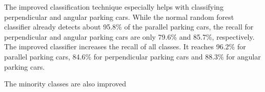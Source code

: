 The improved classification technique especially helps with classifying perpendicular and angular parking cars. While the normal random forest classifier already detects about 95.8\% of the parallel parking cars, the recall for perpendicular and angular parking cars are only 79.6\% and 85.7\%, respectively. The improved classifier increases the recall of all classes. It reaches 96.2\% for parallel parking cars, 84.6\% for perpendicular parking cars and 88.3\% for angular parking cars. 

The minority classes are also improved

 










\begin{table}


\caption{Confusion Matrix of the best found configuration of the proposed two staged classification technique (two random forests and using 10 surrounding samples).}
\label{table:surrounding_classifier_confusion_matrix}
\end{table}

